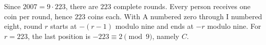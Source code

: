 Since $2007=9\cdot223$, there are $223$ complete rounds. Every person receives one coin per round, hence $\boxed{223}$ coins each. With A numbered zero through I numbered eight, round $r$ starts at $-(r-1)$ modulo nine and ends at $-r$ modulo nine. For $r=223$, the last position is $-223\equiv2\pmod9$, namely $\boxed C$.
